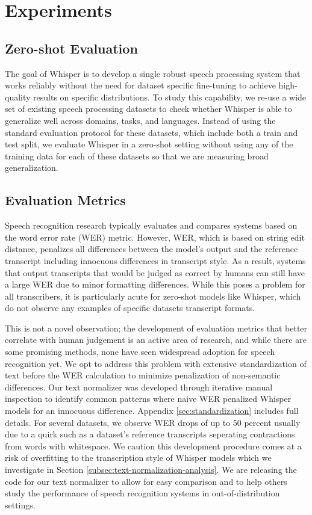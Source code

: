 \documentclass[nohyperref]{article}
\theoremstyle{plain}
\theoremstyle{definition}
\theoremstyle{remark}
\begin{document}
\section{Experiments}\label{sec:experiments}

\subsection{Zero-shot Evaluation}\label{subsec:zeroshot}

The goal of Whisper is to develop a single robust speech processing system that works reliably without the need for dataset specific fine-tuning to achieve high-quality results on specific distributions. To study this capability, we re-use a wide set of existing speech processing datasets to check whether Whisper is able to generalize well across domains, tasks, and languages. Instead of using the standard evaluation protocol for these datasets, which include both a train and test split, we evaluate Whisper in a zero-shot setting without using any of the training data for each of these datasets so that we are measuring broad generalization.

\subsection{Evaluation Metrics}\label{subsec:eval-metric}

Speech recognition research typically evaluates and compares systems based on the word error rate (WER) metric. However, WER, which is based on string edit distance, penalizes all differences between the model's output and the reference transcript including innocuous differences in transcript style. As a result, systems that output transcripts that would be judged as correct by humans can still have a large WER due to minor formatting differences. While this poses a problem for all transcribers, it is particularly acute for zero-shot models like Whisper, which do not observe any examples of specific datasets transcript formats.

This is not a novel observation; the development of evaluation metrics that better correlate with human judgement is an active area of research, and while there are some promising methods, none have seen widespread adoption for speech recognition yet. We opt to address this problem with extensive standardization of text before the WER calculation to minimize penalization of non-semantic differences. Our text normalizer was developed through iterative manual inspection to identify common patterns where naive WER penalized Whisper models for an innocuous difference. Appendix \ref{sec:standardization} includes full details. For several datasets, we observe WER drops of up to 50 percent usually due to a quirk such as a dataset's reference transcripts seperating contractions from words with whitespace. We caution this development procedure comes at a risk of overfitting to the transcription style of Whisper models which we investigate in Section \ref{subsec:text-normalization-analysis}. We are releasing the code for our text normalizer to allow for easy comparison and to help others study the performance of speech recognition systems in out-of-distribution settings.
\end{document}
